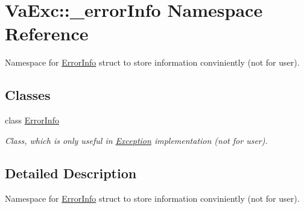 \hypertarget{namespace_va_exc_1_1__error_info}{}\section{Va\+Exc\+:\+:\+\_\+error\+Info Namespace Reference}
\label{namespace_va_exc_1_1__error_info}


Namespace for \hyperlink{class_va_exc_1_1__error_info_1_1_error_info}{Error\+Info} struct to store information conviniently (not for user).  


\subsection*{Classes}
\begin{DoxyCompactItemize}
\item 
class \hyperlink{class_va_exc_1_1__error_info_1_1_error_info}{Error\+Info}
\begin{DoxyCompactList}\small\item\em Class, which is only useful in \hyperlink{class_va_exc_1_1_exception}{Exception} implementation (not for user). \end{DoxyCompactList}\end{DoxyCompactItemize}


\subsection{Detailed Description}
Namespace for \hyperlink{class_va_exc_1_1__error_info_1_1_error_info}{Error\+Info} struct to store information conviniently (not for user). 